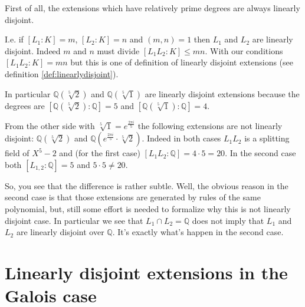 \begin{example}
  First of all, the extensions which have relatively prime degrees are
  always linearly disjoint.

  I.e. if $\left[L_1 : K\right] = m$, $\left[L_2 : K\right] = n$ and
  $\left(m, n\right) = 1$ then $L_1$ and $L_2$ are linearly
  disjoint. Indeed $m$ and $n$ must divide $\left[L_1 L_2 : K\right]
  \le m n$. With our conditions $\left[L_1 L_2 : K\right] = m n$ but
  this is one of definition of linearly disjoint extensions
  (see definition \ref{def:linearlydisjoint}).

  In particular $\mathbb{Q}\left(\sqrt[5]{2}\right)$ and
  $\mathbb{Q}\left(\sqrt[5]{1}\right)$ are linearly disjoint
  extensions because the degrees are
  $\left[\mathbb{Q}\left(\sqrt[5]{2}\right): \mathbb{Q}\right] = 5$
  and
  $\left[\mathbb{Q}\left(\sqrt[5]{1}\right): \mathbb{Q}\right] = 4$.

  From the other side with $\sqrt[5]{1} = e^{\frac{2 \pi i}{5}}$ the
  following extensions are not linearly disjoint:
  $\mathbb{Q}\left(\sqrt[5]{2}\right)$ and
  $\mathbb{Q}\left(e^{\frac{2 \pi i}{5}} \cdot
  \sqrt[5]{2}\right)$.
  Indeed in both cases $L_1 L_2$ is a splitting
  field of $X^5 - 2$ and (for the first case) $\left[L_1 L_2 :
    \mathbb{Q}\right] = 4 \cdot 5 = 20$. In the second case both
  $\left[L_{1,2}:\mathbb{Q}\right] = 5$ and $5 \cdot 5 \ne 20$.

   So, you see that the difference is rather subtle. Well, the obvious
   reason in the second case is that those extensions are generated by
   rules of the same polynomial, but, still some effort is needed to
   formalize why this is not linearly disjoint case.
   In particular we see that $L_1 \cap L_2 = \mathbb{Q}$ does not
   imply that $L_1$ and $L_2$ are linearly disjoint over
   $\mathbb{Q}$. It's exactly what's happen in the second case. 
\end{example}

\section{Linearly disjoint extensions in the Galois case}

